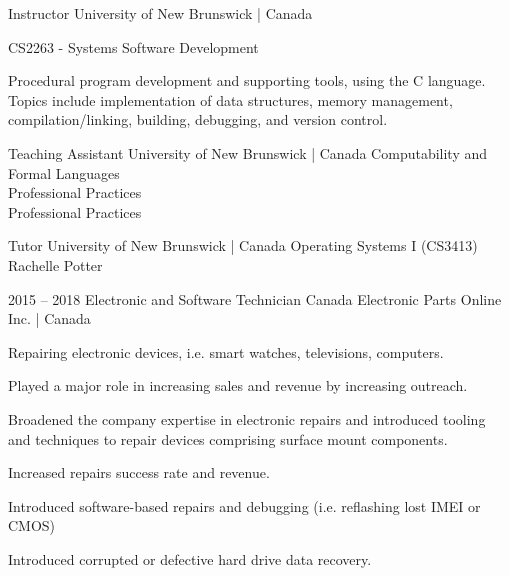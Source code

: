 \documentclass[9.5pt]{developercv} %
\begin{document}
\justifying


\begin{entrylist}
        {Instructor}
        {University of New Brunswick | Canada}{ 
            \textbullet{} CS2263 - Systems Software Development
            \begin{quoting}
            Procedural program development and supporting tools, using the C language. 
            Topics include implementation of data structures, memory management, compilation/linking, building, debugging, and version control. 
            \end{quoting}
            }

        {Teaching Assistant}
        {University of New Brunswick | Canada}
        {        
            \textbullet{} Computability and Formal Languages\\
            \textbullet{} Professional Practices\\
            \textbullet{} Professional Practices\\
            }

        {Tutor}
        {University of New Brunswick | Canada}{        
            \textbullet{} Operating Systems I (CS3413) Rachelle Potter
            }
            
    \entry
        {2015 -- 2018}
        {Electronic and Software Technician}
        {Canada Electronic Parts Online Inc. | Canada}{  
            Repairing electronic devices, i.e. smart watches, televisions, computers.
            \begin{tightemize}
            \item Played a major role in increasing sales and revenue by increasing outreach.
            \item Broadened the company expertise in electronic repairs and introduced tooling and techniques to repair devices comprising surface mount components.
            \item Increased repairs success rate and revenue.
            \item Introduced software-based repairs and debugging (i.e. reflashing lost IMEI or CMOS)
            \item Introduced corrupted or defective hard drive data recovery.
            \end{tightemize}
            }

\end{entrylist}
\end{document}
